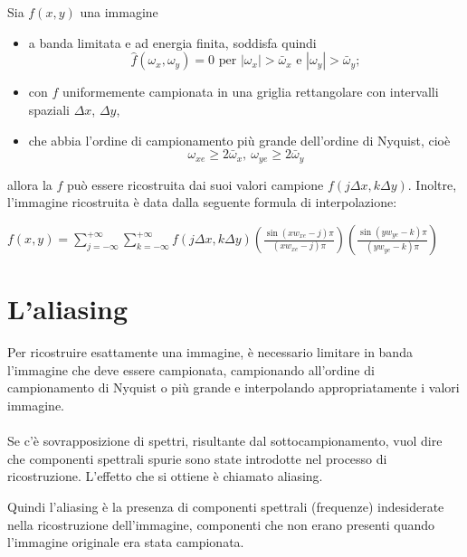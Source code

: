 \begin{theorem}
    Sia $f(x,y)$ una immagine
    \begin{itemize}
        \item  a banda limitata e ad energia finita, soddisfa quindi
              $$
                  \hat{f}(\omega_x,\omega_y) = 0 \text{ per } | \omega_x | >
                  \bar{\omega}_x \text{ e } | \omega_y | > \bar{\omega}_y;
              $$
        \item con $f$ uniformemente campionata in una
              griglia rettangolare con intervalli spaziali $\Delta x$, $\Delta y$,
        \item che abbia l'ordine di campionamento più grande dell'ordine di
              Nyquist, cioè
              $$
                  \omega_{xe} \geq 2 \bar{\omega}_x, \ \omega_{ye} \geq 2 \bar{\omega}_y
              $$
    \end{itemize}

    allora
    la $f$ può essere ricostruita dai suoi valori campione $f(j \Delta x, k
        \Delta y)$. Inoltre, l'immagine ricostruita è data dalla seguente formula di
    interpolazione:
\end{theorem}
\begin{center}
    $f(x,y) = \sum_{j=-\infty}^{+\infty} \sum_{k=-\infty}^{+\infty} f(j \Delta
        x, k \Delta y) (\frac{\sin(xw_{xe}-j)\pi}{(xw_{xe}-j)\pi})
        (\frac{\sin(yw_{ye}-k)\pi}{(yw_{ye}-k)\pi})$
\end{center}
\section{L'aliasing}
Per ricostruire esattamente una immagine, è necessario limitare in banda
l'immagine che deve essere campionata, campionando all'ordine di campionamento
di Nyquist o più grande e interpolando appropriatamente i valori immagine.
\\\\Se c'è sovrapposizione di spettri, risultante dal sottocampionamento, vuol
dire che componenti spettrali spurie sono state introdotte nel processo di
ricostruzione. L'effetto che si ottiene è chiamato aliasing.


Quindi l'aliasing è la presenza di componenti spettrali (frequenze) indesiderate
nella ricostruzione dell'immagine, componenti che non erano presenti quando
l'immagine originale era stata campionata.

